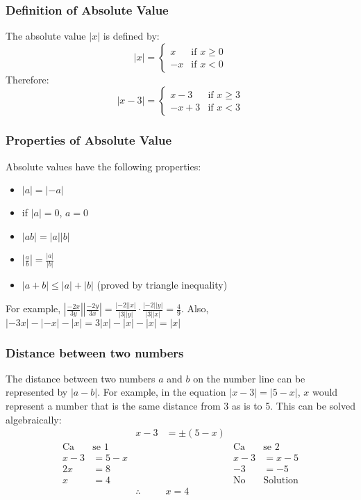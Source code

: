 \documentclass{article}
\begin{document}
	\subsubsection{Definition of Absolute Value}
	The absolute value $|x|$ is defined by:
	\[|x|=\begin{cases}
		x&\text{if }x\geq0\\
		-x&\text{if }x<0
	\end{cases}\]
	Therefore:
	\[|x-3|=\begin{cases}
		x-3&\text{if }x\geq3\\
		-x+3&\text{if }x<3
	\end{cases}\]
	\subsubsection{Properties of Absolute Value}
	Absolute values have the following properties:
	\begin{itemize}
		\item $|a|=|-a|$
		\item if $|a|=0$, $a=0$
		\item $|ab|=|a||b|$
		\item $\left|\frac{a}{b}\right|=\frac{|a|}{|b|}$
		\item $|a+b|\leq|a|+|b|$ (proved by triangle inequality)
	\end{itemize}
	For example, $\left|\frac{-2x}{3y}\right|\left|\frac{-2y}{3x}\right|=\frac{|-2||x|}{|3||y|}\cdot\frac{|-2||y|}{|3||x|}=\frac{4}{9}$. Also, $|-3x|-|-x|-|x|=3|x|-|x|-|x|=|x|$
	\subsubsection{Distance between two numbers}
	The distance between two numbers $a$ and $b$ on the number line can be represented by $|a-b|$.
	For example, in the equation $|x-3|=|5-x|$, $x$ would represent a number that is the same distance from 3 as is to 5. This can be solved algebraically:
	\begin{align*}
		&&x-3&=\pm(5-x)\\
		\text{Ca}&\text{se 1}&&&\text{Ca}&\text{se 2}\\
		x-3&=5-x&&&x-3&=x-5\\
		2x&=8&&&-3&=-5\\
		x&=4&&&\text{No }&\text{Solution}\\
		&&\therefore{}&x=4
	\end{align*}
\end{document}
